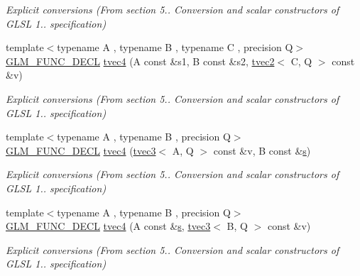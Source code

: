 \begin{DoxyCompactItemize}
\begin{DoxyCompactList}\small\item\em Explicit conversions (From section 5.. Conversion and scalar constructors of G\+L\+SL 1.. specification) \end{DoxyCompactList}\item 
{\footnotesize template$<$typename A , typename B , typename C , precision Q$>$ }\\\hyperlink{setup_8hpp_ab2d052de21a70539923e9bcbf6e83a51}{G\+L\+M\+\_\+\+F\+U\+N\+C\+\_\+\+D\+E\+CL} \hyperlink{structglm_1_1detail_1_1tvec4_a8ef9e52bfba428b34a6503b41d405414}{tvec4} (A const \&s1, B const \&s2, \hyperlink{structglm_1_1detail_1_1tvec2}{tvec2}$<$ C, Q $>$ const \&v)
\begin{DoxyCompactList}\small\item\em Explicit conversions (From section 5.. Conversion and scalar constructors of G\+L\+SL 1.. specification) \end{DoxyCompactList}\item 
{\footnotesize template$<$typename A , typename B , precision Q$>$ }\\\hyperlink{setup_8hpp_ab2d052de21a70539923e9bcbf6e83a51}{G\+L\+M\+\_\+\+F\+U\+N\+C\+\_\+\+D\+E\+CL} \hyperlink{structglm_1_1detail_1_1tvec4_a3cfd3a19a14623991a562e5834cc6d1f}{tvec4} (\hyperlink{structglm_1_1detail_1_1tvec3}{tvec3}$<$ A, Q $>$ const \&v, B const \&\hyperlink{structglm_1_1detail_1_1tvec4_a82cbced4cbd070056c5acbc1d4d4906f}{s})
\begin{DoxyCompactList}\small\item\em Explicit conversions (From section 5.. Conversion and scalar constructors of G\+L\+SL 1.. specification) \end{DoxyCompactList}\item 
{\footnotesize template$<$typename A , typename B , precision Q$>$ }\\\hyperlink{setup_8hpp_ab2d052de21a70539923e9bcbf6e83a51}{G\+L\+M\+\_\+\+F\+U\+N\+C\+\_\+\+D\+E\+CL} \hyperlink{structglm_1_1detail_1_1tvec4_a00972125f3cbeec17aaf42cacae4e73e}{tvec4} (A const \&\hyperlink{structglm_1_1detail_1_1tvec4_a82cbced4cbd070056c5acbc1d4d4906f}{s}, \hyperlink{structglm_1_1detail_1_1tvec3}{tvec3}$<$ B, Q $>$ const \&v)
\begin{DoxyCompactList}\small\item\em Explicit conversions (From section 5.. Conversion and scalar constructors of G\+L\+SL 1.. specification) \end{DoxyCompactList}\item 

\end{DoxyCompactItemize}
